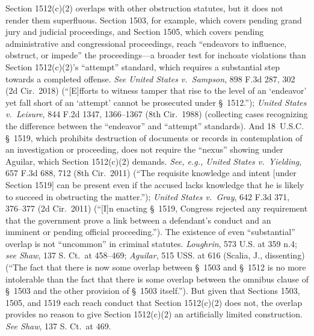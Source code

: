 Section 1512(c)(2) overlaps with other obstruction statutes, but it does not render them superfluous.
Section 1503, for example, which covers pending grand jury and judicial proceedings, and Section 1505, which covers pending administrative and congressional proceedings, reach ``endeavors to influence, obstruct, or impede'' the proceedings---a broader test for inchoate violations than Section 1512(c)(2)'s ``attempt'' standard, which requires a substantial step towards a completed offense.
\textit{See United States v.\ Sampson}, 898 F.3d 287, 302 (2d Cir.~2018) (``[E]fforts to witness tamper that rise to the level of an `endeavor' yet fall short of an `attempt' cannot be prosecuted under \S~1512.'');
\textit{United States v.\ Leisure}, 844 F.2d 1347, 1366--1367 (8th Cir.~1988) (collecting cases recognizing the difference between the ``endeavor'' and ``attempt'' standards).
And 18~U.S.C. \S~1519, which prohibits destruction of documents or records in contemplation of an investigation or proceeding, does not require the ``nexus'' showing under Aguilar, which Section 1512(c)(2) demands.
\textit{See, e.g., United States v.\ Yielding}, 657 F.3d 688, 712 (8th Cir.~2011) (``The requisite knowledge and intent [under Section 1519] can be present even if the accused lacks knowledge that he is likely to succeed in obstructing the matter.'');
\textit{United States v.\ Gray}, 642 F.3d 371, 376--377 (2d Cir.~2011) (``[I]n enacting \S~1519, Congress rejected any requirement that the government prove a link between a defendant's conduct and an imminent or pending official proceeding.'').
The existence of even ``substantial'' overlap is not ``uncommon'' in criminal statutes.
\textit{Loughrin}, 573 U.S. at 359 n.4;
\textit{see Shaw}, 137 S. Ct.~at 458--469;
\textit{Aguilar}, 515 USS. at 616 (Scalia, J., dissenting) (``The fact that there is now some overlap between \S~1503 and \S~1512 is no more intolerable than the fact that there is some overlap between the omnibus clause of \S~1503 and the other provision of \S~1503 itself.'').
But given that Sections 1503, 1505, and 1519 each reach conduct that Section 1512(c)(2) does not, the overlap provides no reason to give Section 1512(c)(2) an artificially limited construction.
\textit{See Shaw}, 137 S. Ct.~at 469.%
